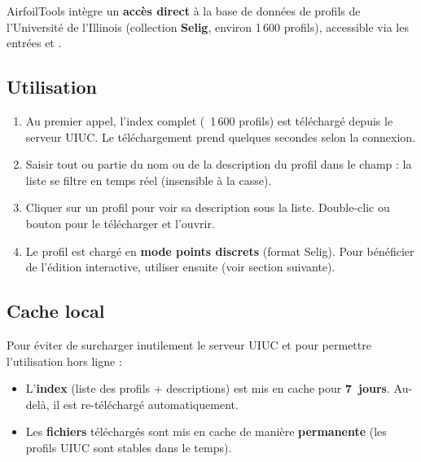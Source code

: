 AirfoilTools intègre un \textbf{accès direct} à la base de données
de profils de l'Université de l'Illinois (collection
\textbf{Selig}, environ 1\,600 profils), accessible via les entrées
 et .


\subsection{Utilisation}

\begin{enumerate}
    \item Au premier appel, l'index complet (~1\,600 profils) est
        téléchargé depuis le serveur UIUC. Le téléchargement prend
        quelques secondes selon la connexion.
    \item Saisir tout ou partie du nom ou de la description du
        profil dans le champ  : la liste se filtre
        en temps réel (insensible à la casse).
    \item Cliquer sur un profil pour voir sa description sous la
        liste. Double-clic ou bouton  pour le
        télécharger et l'ouvrir.
    \item Le profil est chargé en \textbf{mode points discrets}
        (format Selig). Pour bénéficier de l'édition interactive,
        utiliser ensuite  (voir section suivante).
\end{enumerate}

\subsection{Cache local}

Pour éviter de surcharger inutilement le serveur UIUC et pour
permettre l'utilisation hors ligne :

\begin{itemize}
    \item L'\textbf{index} (liste des profils + descriptions) est
        mis en cache pour \textbf{7~jours}. Au-delà, il est
        re-téléchargé automatiquement.
    \item Les \textbf{fichiers } téléchargés sont mis
        en cache de manière \textbf{permanente} (les profils UIUC
        sont stables dans le temps).
\end{itemize}


